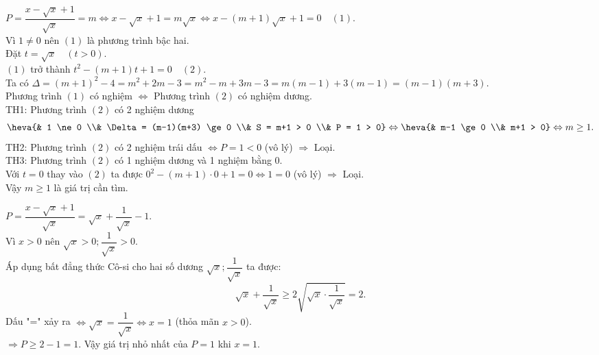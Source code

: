 \begin{bt}
{\begin{cacy}
\item $P = \dfrac{x-\sqrt{x}+1}{\sqrt{x}} = m \Leftrightarrow x-\sqrt{x}+1 = m\sqrt{x} \Leftrightarrow x-(m+1)\sqrt{x}+1 = 0 \quad (1)$.\\
Vì $1 \ne 0$ nên $(1)$ là phương trình bậc hai.\\
Đặt $t = \sqrt{x} \quad (t > 0)$.\\
$(1)$ trở thành $t^2 - (m+1)t + 1 = 0 \quad (2)$.\\
Ta có $\Delta = (m+1)^2 - 4 = m^2+2m-3 = m^2-m+3m-3 = m(m-1)+3(m-1) = (m-1)(m+3)$.\\
Phương trình $(1)$ có nghiệm $\Leftrightarrow$ Phương trình $(2)$ có nghiệm dương.\\
TH1: Phương trình $(2)$ có 2 nghiệm dương
\[ \heva{& 1 \ne 0 \\& \Delta = (m-1)(m+3) \ge 0 \\& S = m+1 > 0 \\& P = 1 > 0} \Leftrightarrow \heva{& m-1 \ge 0 \\& m+1 > 0} \Leftrightarrow m \ge 1. \]
TH2: Phương trình $(2)$ có 2 nghiệm trái dấu $\Leftrightarrow P = 1 < 0$ (vô lý) $\Rightarrow$ Loại.\\
TH3: Phương trình $(2)$ có 1 nghiệm dương và 1 nghiệm bằng 0.\\
Với $t = 0$ thay vào $(2)$ ta được $0^2 - (m+1) \cdot 0 + 1 = 0 \Leftrightarrow 1 = 0$ (vô lý) $\Rightarrow$ Loại.\\
Vậy $m \ge 1$ là giá trị cần tìm.

\item $P = \dfrac{x-\sqrt{x}+1}{\sqrt{x}} = \sqrt{x} + \dfrac{1}{\sqrt{x}} - 1$.\\
Vì $x > 0$ nên $\sqrt{x} > 0; \dfrac{1}{\sqrt{x}} > 0$.\\
Áp dụng bất đẳng thức Cô-si cho hai số dương $\sqrt{x}; \dfrac{1}{\sqrt{x}}$ ta được:
\[ \sqrt{x} + \dfrac{1}{\sqrt{x}} \ge 2\sqrt{\sqrt{x} \cdot \dfrac{1}{\sqrt{x}}} = 2. \]
Dấu "=" xảy ra $\Leftrightarrow \sqrt{x} = \dfrac{1}{\sqrt{x}} \Leftrightarrow x = 1$ (thỏa mãn $x > 0$).\\
$\Rightarrow P \ge 2-1 = 1$. Vậy giá trị nhỏ nhất của $P = 1$ khi $x = 1$.
\end{cacy}
}
\end{bt}


